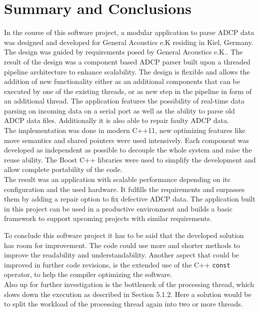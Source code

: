 \chapter{Summary and Conclusions}
In the course of this software project, a modular application to parse ADCP data was designed and developed for General Acoustics e.K residing in Kiel, Germany. The design was guided by requirements posed by General Acoustics e.K.. The result of the design was a component based ADCP parser built upon a threaded pipeline architecture to enhance scalability. The design is flexible and allows the addition of new functionality either as an additional components that can be executed by one of the existing threads, or as new step in the pipeline in form of an additional thread. The application features the possibility of real-time data parsing on incoming data on a serial port as well as the ability to parse old ADCP data files. Additionally it is also able to repair faulty ADCP data.\\
The implementation was done in modern C++11, new optimizing features like move semantics and shared pointers were used intensively. Each component was developed as independent as possible to decouple the whole system and raise the reuse ability. The Boost C++ libraries were used to simplify the development and allow complete portability of the code.\\
The result was an application with scalable performance depending on its configuration and the used hardware. It fulfills the requirements and surpasses them by adding a repair option to fix defective ADCP data. The application built in this project can be used in a productive environment and builds a basic framework to support upcoming projects with similar requirements.

To conclude this software project it has to be said that the developed solution has room for improvement. The code could use more and shorter methods to improve the readability and understandability. Another aspect that could be 
improved in further code revisions, is the extended use of the C++ \texttt{const} operator, to help the compiler optimizing the software.\\
Also up for further investigation is the bottleneck of the processing thread, which slows down the execution as described in Section 5.1.2. Here a solution would be to split the workload of the processing thread again into two or more threads.

